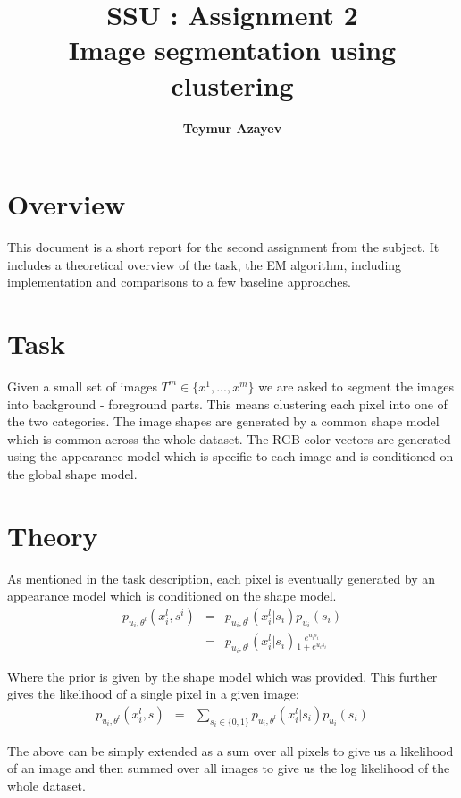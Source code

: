 \documentclass[11pt]{article}
\title{\textbf{SSU : Assignment 2} \\ \textbf{Image segmentation using clustering}}
\author{\textbf{Teymur Azayev}}
\date{}
\begin{document}
\maketitle

\section{Overview}

This document is a short report for the second assignment from the subject. It includes a theoretical overview of the task, the EM algorithm, including implementation and comparisons to a few baseline approaches.

\section{Task}
Given a small set of images $T^m \in\{x^1, ... , x^m\}$ we are asked to segment the images into background - foreground parts. This means clustering each pixel into one of the two categories. The image shapes are generated by a common shape model which is common across the whole dataset. The RGB color vectors are generated using the appearance model which is specific to each image and is conditioned on the global shape model.


\section{Theory}
As mentioned in the task description, each pixel is eventually generated by an appearance model which is conditioned on the shape model. \\ 

\begin{eqnarray}
p_{u_i,\theta^l}(x_i^l,s^i) &=& p_{u_i,\theta^l}(x_i^l|s_i) p_{u_i}(s_i) \\
&=& p_{u_i,\theta^l}(x_i^l|s_i) \frac{e^{u_is_i}}{1 + e^{u_is_i}}
\end{eqnarray}

Where the prior is given by the shape model which was provided. This further gives the likelihood of a single pixel
in a given image: \\

\begin{eqnarray}
p_{u_i,\theta^l}(x_i^l,s) &=& \sum_{s_i\in\{0,1\}}{p_{u_i,\theta^l}(x_i^l|s_i) p_{u_i}(s_i) } 
\end{eqnarray}

The above can be simply extended as a sum over all pixels to give us a likelihood of an image and then summed over all images to give us the log likelihood of the whole dataset. \\ 
\end{document}
